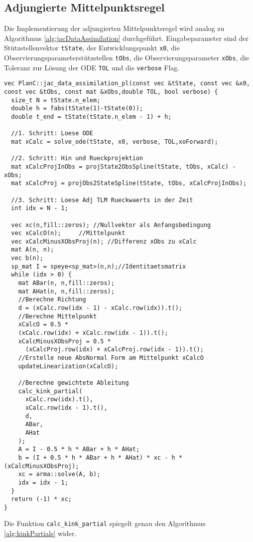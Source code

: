 \subsection{Adjungierte Mittelpunktsregel}
Die Implementierung der adjungierten Mittelpunktsregel wird analog zu Algorithmus \ref{alg:jacDataAssimilation} durchgeführt. Eingabeparameter sind der Stützstellenvektor \texttt{tState}, der Entwicklungspunkt \texttt{x0}, die Observierungsparameterstützstellen \texttt{tObs}, die Observierungsparameter \texttt{xObs}, die Toleranz zur Lösung der ODE \texttt{TOL} und die \texttt{verbose} Flag.
\begin{lstlisting}[caption=Berechnung der adjungierten Mittelpunktsregel, label=lst:adjMidpointRule]
vec PlanC::jac_data_assimilation_pl(const vec &tState, const vec &x0, const vec &tObs, const mat &xObs,double TOL, bool verbose) {
  size_t N = tState.n_elem;
  double h = fabs(tState(1)-tState(0));
  double t_end = tState(tState.n_elem - 1) + h;

  //1. Schritt: Loese ODE
  mat xCalc = solve_ode(tState, x0, verbose, TOL,xoForward);
  
  //2. Schritt: Hin und Rueckprojektion
  mat xCalcProjInObs = projState2ObsSpline(tState, tObs, xCalc) - xObs;
  mat xCalcProj = projObs2StateSpline(tState, tObs, xCalcProjInObs);
  
  //3. Schritt: Loese Adj TLM Rueckwaerts in der Zeit
  int idx = N - 1;
  
  vec xc(n,fill::zeros); //Nullvektor als Anfangsbedingung
  vec xCalcO(n);	 //Mittelpunkt
  vec xCalcMinusXObsProj(n); //Differenz xObs zu xCalc 
  mat A(n, n);
  vec b(n);
  sp_mat I = speye<sp_mat>(n,n);//Identitaetsmatrix
  while (idx > 0) {
    mat ABar(n, n,fill::zeros);
    mat AHat(n, n,fill::zeros);
    //Berechne Richtung
    d = (xCalc.row(idx - 1) - xCalc.row(idx)).t();
    //Berechne Mittelpunkt
    xCalcO = 0.5 * 
	(xCalc.row(idx) + xCalc.row(idx - 1)).t();
    xCalcMinusXObsProj = 0.5 * 
	  (xCalcProj.row(idx) + xCalcProj.row(idx - 1)).t();
    //Erstelle neue AbsNormal Form am Mittelpunkt xCalcO
    updateLinearization(xCalcO);
    
    //Berechne gewichtete Ableitung
    calc_kink_partial(
	  xCalc.row(idx).t(), 
	  xCalc.row(idx - 1).t(),
	  d,
	  ABar,
	  AHat
    );
    A = I - 0.5 * h * ABar + h * AHat;
    b = (I + 0.5 * h * ABar + h * AHat) * xc - h * (xCalcMinusXObsProj);
    xc = arma::solve(A, b);
    idx = idx - 1;
  }
  return (-1) * xc;
}
\end{lstlisting}
Die Funktion \texttt{calc\_kink\_partial} spiegelt genau den Algorithmus \ref{alg:kinkPartials} wider.
